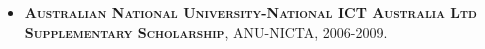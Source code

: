 \documentclass[10pt]{article}
\begin{document}
\begin{itemize}
\item \textsc{\textbf{Australian National University-National ICT Australia Ltd Supplementary Scholarship}},
ANU-NICTA, 2006-2009.

%
%

\end{itemize}
\end{document}
